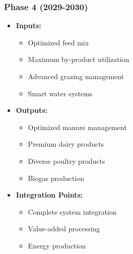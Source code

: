 \subsubsection{Phase 4 (2029-2030)}
\begin{itemize}
    \item \textbf{Inputs:}
    \begin{itemize}
        \item Optimized feed mix
        \item Maximum by-product utilization
        \item Advanced grazing management
        \item Smart water systems
    \end{itemize}
    \item \textbf{Outputs:}
    \begin{itemize}
        \item Optimized manure management
        \item Premium dairy products
        \item Diverse poultry products
        \item Biogas production
    \end{itemize}
    \item \textbf{Integration Points:}
    \begin{itemize}
        \item Complete system integration
        \item Value-added processing
        \item Energy production
    \end{itemize}
\end{itemize}

